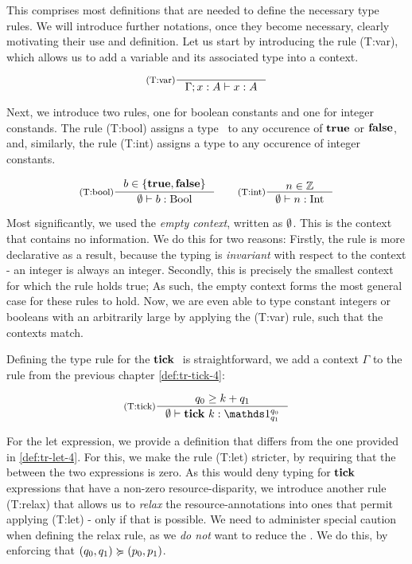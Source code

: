 This comprises most definitions that are needed to define the necessary type rules. We will introduce further notations, once they become necessary, clearly motivating their use and definition. Let us start by introducing the rule (T:var), which allows us to add a variable and its associated type into a context.

\[
   \inference[(T:var)]
   {}
   {\typing{\Gamma; x: A}{x}{A}}
\]

Next, we introduce two rules, one for boolean constants and one for integer constands. The rule (T:bool) assigns a type \bool~to any occurence of \(\mathbf{true}\) or \(\mathbf{false}\), and, similarly, the rule (T:int) assigns a type \typeint to any occurence of integer constants.

\[
   \inference[(T:bool)]
   {b \in \{\true, \false\}}
   {\typing{\emptycontext}{b}{\text{\bool}}}%
   \qquad
   \inference[(T:int)]
   {n \in \mathbb{Z}}
   {\typing{\emptycontext}{n}{\text{\typeint}}}
\]

Most significantly, we used the \emph{empty context}, written as \(\emptyset\). This is the context that contains no information. We do this for two reasons: Firstly, the rule is more declarative as a result, because the typing is \emph{invariant} with respect to the context - an integer is always an integer. Secondly, this is precisely the smallest context for which the rule holds true; As such, the empty context forms the most general case for these rules to hold. Now, we are even able to type constant integers or booleans with an arbitrarily large  by applying the (T:var) rule, such that the contexts match. 

Defining the type rule for the \(\mathbf{tick}~\) is straightforward, we add a context \(\Gamma\) to the rule from the previous chapter \cref{def:tr-tick-4}:

\[
   \inference[(T:tick)]
   {q_0 \geq k + q_1}
   {\typing{\emptycontext}{\tick{k}}{\ratype{\unit}{q_0}{q_1}}}
\]

For the let expression, we provide a definition that differs from the one provided in \cref{def:tr-let-4}. For this, we make the rule (T:let) stricter, by requiring that the  between the two expressions is zero. As this would deny typing for \(\mathbf{tick}~\) expressions that have a non-zero resource-disparity, we introduce another rule (T:relax) that allows us to \emph{relax} the resource-annotations into ones that permit applying (T:let) - only if that is possible. 
We need to administer special caution when defining the relax rule, as we \emph{do not} want to reduce the . We do this, by enforcing that \((q_0, q_1) \succcurlyeq (p_0, p_1)\).

